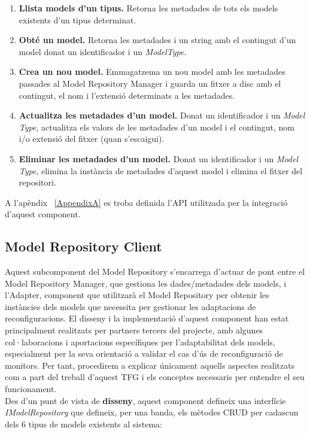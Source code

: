 \begin{enumerate}
\item \textbf{Llista models d'un tipus.} Retorna les metadades de tots els models existents d'un tipus determinat.
\item \textbf{Obté un model.} Retorna les metadades i un string amb el contingut d'un model donat un identificador i un \textit{ModelType}.
\item \textbf{Crea un nou model.} Emmagatzema un nou model amb les metadades passades al Model Repository Manager i guarda un fitxer a disc amb el contingut, el nom i l'extensió determinats a les metadades.
\item \textbf{Actualitza les metadades d'un model.} Donat un identificador i un \textit{Model Type}, actualitza els valors de les metadades d'un model i el contingut, nom i/o extensió del fitxer (quan s'escaigui). 
\item \textbf{Eliminar les metadades d'un model.} Donat un identificador i un \textit{Model Type}, elimina la instància de metadades d'aquest model i elimina el fitxer del repositori.
\end{enumerate}

A l'apèndix ~\ref{AppendixA} es troba definida l'API utilitzada per la integració d'aquest component.

\subsection{Model Repository Client}

Aquest subcomponent del Model Repository s'encarrega d'actuar de pont entre el Model Repository Manager, que gestiona les dades/metadades dels models, i l'Adapter, component que utilitzarà el Model Repository per obtenir les instàncies dels models que necessita per gestionar les adaptacions de reconfiguracions. El disseny i la implementació d'aquest component han estat principalment realitzats per partners tercers del projecte, amb algunes col·laboracions i aportacions específiques per l'adaptabilitat dels models, especialment per la seva orientació a validar el cas d'ús de reconfiguració de monitors. Per tant, procedirem a explicar únicament aquells aspectes realitzats com a part del treball d'aquest TFG i els conceptes necessaris per entendre el seu funcionament.\\

Des d'un punt de vista de \textbf{disseny}, aquest component defineix una interfície \textit{IModelRepository} que defineix, per una banda, els mètodes CRUD per cadascun dels 6 tipus de models existents al sistema:
 
